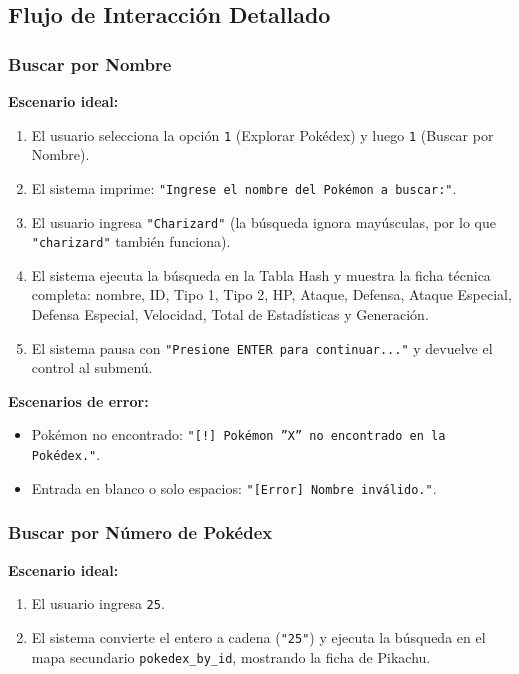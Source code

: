 \documentclass[12pt, letterpaper]{article}
\begin{document}
\subsection{Flujo de Interacción Detallado}

\subsubsection{Buscar por Nombre}

\textbf{Escenario ideal:}
\begin{enumerate}
    \item El usuario selecciona la opción \texttt{1} (Explorar Pokédex) y luego \texttt{1} (Buscar por Nombre).
    \item El sistema imprime: \texttt{"Ingrese el nombre del Pokémon a buscar:"}.
    \item El usuario ingresa \texttt{"Charizard"} (la búsqueda ignora mayúsculas, por lo que \texttt{"charizard"} también funciona).
    \item El sistema ejecuta la búsqueda en la Tabla Hash y muestra la ficha técnica completa: nombre, ID, Tipo 1, Tipo 2, HP, Ataque, Defensa, Ataque Especial, Defensa Especial, Velocidad, Total de Estadísticas y Generación.
    \item El sistema pausa con \texttt{"Presione ENTER para continuar..."} y devuelve el control al submenú.
\end{enumerate}

\textbf{Escenarios de error:}
\begin{itemize}
    \item Pokémon no encontrado: \texttt{"[!] Pokémon ''X'' no encontrado en la Pokédex."}.
    \item Entrada en blanco o solo espacios: \texttt{"[Error] Nombre inválido."}.
\end{itemize}

\subsubsection{Buscar por Número de Pokédex}

\textbf{Escenario ideal:}
\begin{enumerate}
    \item El usuario ingresa \texttt{25}.
    \item El sistema convierte el entero a cadena (\texttt{"25"}) y ejecuta la búsqueda en el mapa secundario \texttt{pokedex\_by\_id}, mostrando la ficha de Pikachu.
\end{enumerate}
\end{document}
